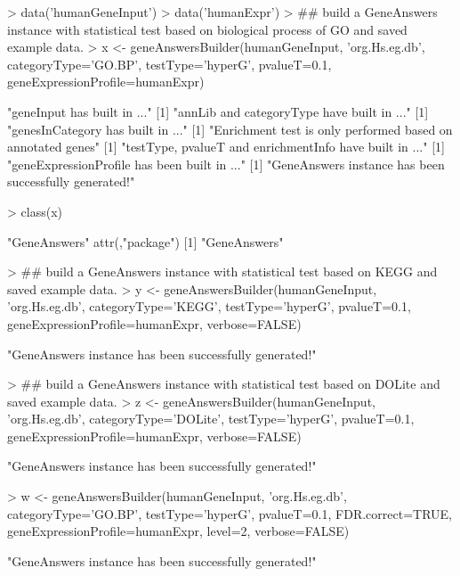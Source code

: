 \documentclass[a4paper]{article}
\begin{document}
\begin{Schunk}
\begin{Sinput}
> data('humanGeneInput')
> data('humanExpr')
> ## build a GeneAnswers instance with statistical test based on biological process of GO and saved example data.
> x <- geneAnswersBuilder(humanGeneInput, 'org.Hs.eg.db', categoryType='GO.BP', testType='hyperG', pvalueT=0.1, geneExpressionProfile=humanExpr)
\end{Sinput}
\begin{Soutput}
[1] "geneInput has built in ..."
[1] "annLib and categoryType have built in ..."
[1] "genesInCategory has built in ..."
[1] "Enrichment test is only performed based on annotated genes"
[1] "testType, pvalueT and enrichmentInfo have built in ..."
[1] "geneExpressionProfile has been built in ..."
[1] "GeneAnswers instance has been successfully generated!"
\end{Soutput}
\begin{Sinput}
> class(x)
\end{Sinput}
\begin{Soutput}
[1] "GeneAnswers"
attr(,"package")
[1] "GeneAnswers"
\end{Soutput}
\begin{Sinput}
> ## build a GeneAnswers instance with statistical test based on KEGG and saved example data. 
> y <- geneAnswersBuilder(humanGeneInput, 'org.Hs.eg.db', categoryType='KEGG', testType='hyperG', pvalueT=0.1, geneExpressionProfile=humanExpr, verbose=FALSE)
\end{Sinput}
\begin{Soutput}
[1] "GeneAnswers instance has been successfully generated!"
\end{Soutput}
\begin{Sinput}
> ## build a GeneAnswers instance with statistical test based on DOLite and saved example data.
> z <- geneAnswersBuilder(humanGeneInput, 'org.Hs.eg.db', categoryType='DOLite', testType='hyperG', pvalueT=0.1, geneExpressionProfile=humanExpr, verbose=FALSE)
\end{Sinput}
\begin{Soutput}
[1] "GeneAnswers instance has been successfully generated!"
\end{Soutput}
\begin{Sinput}
> w <- geneAnswersBuilder(humanGeneInput, 'org.Hs.eg.db', categoryType='GO.BP', testType='hyperG', pvalueT=0.1, FDR.correct=TRUE, geneExpressionProfile=humanExpr, level=2, verbose=FALSE) 
\end{Sinput}
\begin{Soutput}
[1] "GeneAnswers instance has been successfully generated!"
\end{Soutput}
\end{Schunk}
\end{document}
